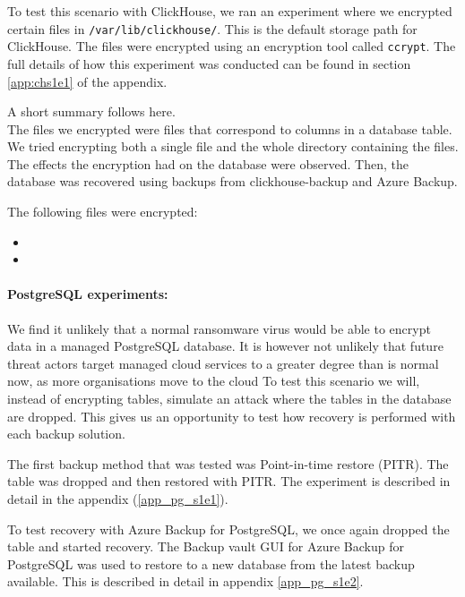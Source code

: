 To test this scenario with ClickHouse, we ran an experiment where we encrypted certain files in \texttt{/var/lib/clickhouse/}. This is the default storage path for ClickHouse. The files were encrypted using an encryption tool called \texttt{ccrypt}. The full details of how this experiment was conducted can be found in section \ref{app:chs1e1} of the appendix.

A short summary follows here.\\

\noindent
The files we encrypted were files that correspond to columns in a database table.
We tried encrypting both a single file and the whole directory containing the files.
The effects the encryption had on the database were observed.
Then, the database was recovered using backups from clickhouse-backup and Azure Backup.

The following files were encrypted:

\begin{itemize}
    \item {}
    \item {}
\end{itemize}

\paragraph{PostgreSQL experiments:} %
We find it unlikely that a normal ransomware virus would be able 
to encrypt data in a managed PostgreSQL database. It is however not unlikely that future threat actors target managed cloud services to a greater degree than is normal now, as more organisations move to the cloud
To test this scenario we will, instead of encrypting tables, 
simulate an attack where the tables in the database are dropped.
This gives us an opportunity to test how recovery is performed with each backup solution.


The first backup method that was tested was Point-in-time restore (PITR).
The table was dropped and then restored with PITR.
The experiment is described in detail in the appendix (\ref{app_pg_s1e1}). 

To test recovery with Azure Backup for PostgreSQL,
we once again dropped the table and started recovery.
The Backup vault GUI for Azure Backup for PostgreSQL was used to restore to a new database from the latest backup available.
This is described in detail in appendix \ref{app_pg_s1e2}.

